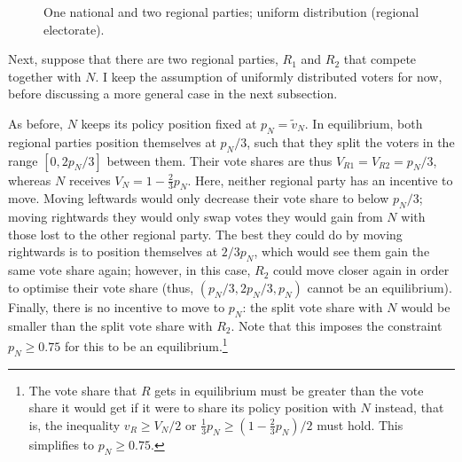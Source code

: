 \documentclass[11pt]{article}
\begin{document}
\begin{figure}[ht]
    \centering 
     \caption{One national and two regional parties; uniform distribution (regional electorate).} \label{fig:mod1}
 \end{figure}

Next, suppose that there are two regional parties, $R_1$ and $R_2$ that compete together with $N$. I keep the assumption of uniformly distributed voters for now, before discussing a more general case in the next subsection.

As before, $N$ keeps its policy position fixed at $p_N = \tilde{v}_N$. In equilibrium, both regional parties position themselves at $p_N / 3$, such that they split the voters in the range $[0, 2 p_N/3]$ between them. Their vote shares are thus $V_{R1} = V_{R2} = p_N / 3$, whereas $N$ receives $V_N = 1 - \frac{2}{3} p_N$. Here, neither regional party has an incentive to move. Moving leftwards would only decrease their vote share to below $p_N / 3$; moving rightwards they would only swap votes they would gain from $N$ with those lost to the other regional party. The best they could do by moving rightwards is to position themselves at $2/3 p_N$, which would see them gain the same vote share again; however, in this case, $R_2$ could move closer again in order to optimise their vote share (thus, $(p_N / 3, 2 p_N/3, p_N) $ cannot be an equilibrium). Finally, there is no incentive to move to $p_N$: the split vote share with $N$ would be smaller than the split vote share with $R_2$. Note that this imposes the constraint $p_N \geq 0.75$ for this to be an equilibrium.\footnote{The vote share that $R$ gets in equilibrium must be greater than the vote share it would get if it were to share its policy position with $N$ instead, that is, the inequality $v_R \geq V_N / 2$ or $\frac{1}{3} p_N \geq (1 - \frac{2}{3} p_N) / 2$ must hold. This simplifies to $p_N \geq 0.75$.}
\end{document}
